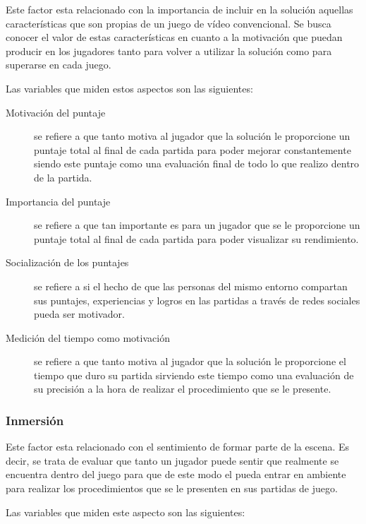 Este factor esta relacionado con la importancia de incluir en la solución
aquellas características que son propias de un juego de vídeo convencional. Se
busca conocer el valor de estas características en cuanto a la motivación que
puedan producir en los jugadores tanto para volver a utilizar la solución como
para superarse en cada juego.

Las variables que miden estos aspectos son las siguientes:

\begin{description}

\item[Motivación del puntaje] se refiere a que tanto motiva al jugador que la
    solución le proporcione un puntaje total al final de cada partida para poder
    mejorar constantemente siendo este puntaje como una evaluación final de todo
    lo que realizo dentro de la partida.

\item[Importancia del puntaje] se refiere a que tan importante es para un
    jugador que se le proporcione un puntaje total al final de cada partida para
    poder visualizar su rendimiento.

\item[Socialización de los puntajes] se refiere a si el hecho de que las
    personas del mismo entorno compartan sus puntajes, experiencias y logros en
    las partidas a través de redes sociales pueda ser motivador.

\item[Medición del tiempo como motivación] se refiere a que tanto motiva al
    jugador que la solución le proporcione el tiempo que duro su partida
    sirviendo este tiempo como una evaluación de su precisión a la hora de
    realizar el procedimiento que se le presente.

\end{description} 


\subsubsection{Inmersión}
\label{sec:sub_inmersion}

Este factor esta relacionado con el sentimiento de formar parte de la escena. Es
decir, se trata de evaluar que tanto un jugador puede sentir que realmente se
encuentra dentro del juego para que de este modo el pueda entrar en ambiente
para realizar los procedimientos que se le presenten en sus partidas de juego.

Las variables que miden este aspecto son las siguientes:

